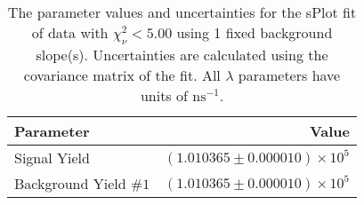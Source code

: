 
\begin{table}
    \begin{center}
        \begin{tabular}{lr}\toprule
            Parameter & Value \\\midrule
            Signal Yield & $(1.010365 \pm 0.000010) \times 10^{5}$ \\
            Background Yield $\#1$ & $(1.010365 \pm 0.000010) \times 10^{5}$ \\\bottomrule
        \end{tabular}
        \caption{The parameter values and uncertainties for the sPlot fit of data with $\chi^2_\nu < 5.00$ using 1 fixed background slope(s). Uncertainties are calculated using the covariance matrix of the fit. All $\lambda$ parameters have units of $\si{\nano\second}^{-1}$.}
    \end{center}
\end{table}
